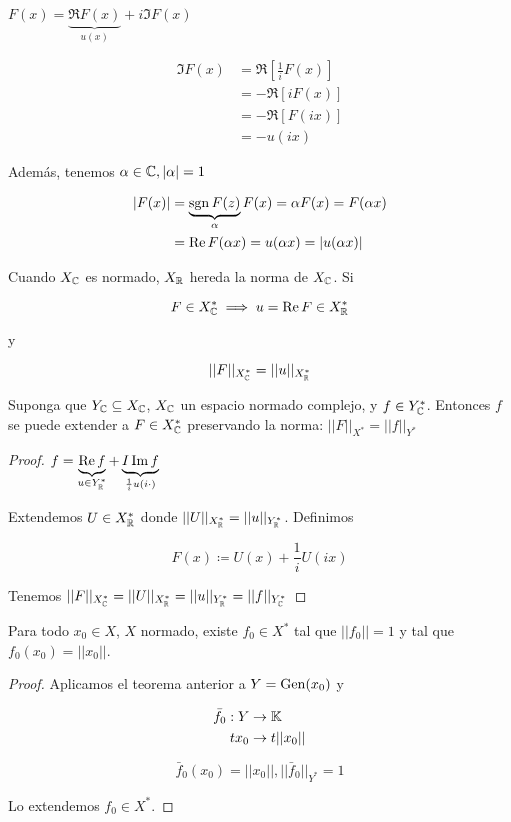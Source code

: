 $F(x)=\underbrace{\Re F(x)}_{u(x)}+i\Im F(x)$

\begin{align*}
    \Im F(x)&=\Re\left[\frac{1}{i} F(x)\right]\\
    &=-\Re[i F(x)]\\
    &=-\Re[F(ix)]\\
    &=-u(ix)
\end{align*}

Además, tenemos $\alpha\in \mathbb{C},|\alpha|=1$

\begin{align*}
    |F(x)|&=\underbrace{\operatorname{sgn} F(z)}_\alpha F(x)=\alpha F(x)=F(\alpha x)\\
    &=\operatorname{Re} F(\alpha x)=u(\alpha x)=|u(\alpha x)|
\end{align*}

Cuando $X_{\mathbb{C}}$ es normado, $X_{\mathbb{R}}$ hereda la norma de $X_{\mathbb{C}}$. Si 

\[F\in X_{\mathbb{C}}^*\implies u=\operatorname{Re} F\in X_{\mathbb{R}}^*\]

y 

\[||F||_{X_{\mathbb{C}}^*}=||u||_{X_{\mathbb{R}}^*}\]

\begin{ftheorem}
    Suponga que $Y_{\mathbb{C}}\subseteq X_{\mathbb{C}}$, $X_{\mathbb{C}}$ un espacio normado complejo, y $f\in Y_{\mathbb{C}}^*$. Entonces $f$ se puede extender a $F\in X_{\mathbb{C}}^*$ preservando la norma: $||F||_{X^*}=||f||_{Y^*}$
\end{ftheorem}

\begin{proof}
    $f=\underbrace{\operatorname{Re} f}_{u\in Y_{\mathbb{R}}^*}+\underbrace{I\operatorname{Im} f}_{\frac{1}{i}u(i\cdot)}$

    Extendemos $U\in X_{\mathbb{R}}^*$ donde $||U||_{X_{\mathbb{R}}^*}=||u||_{Y_{\mathbb{R}}^*}$. Definimos 

    \[F(x)\coloneqq U(x)+\frac{1}{i}U(ix)\]

    Tenemos $||F||_{X_{\mathbb{C}}^*}=||U||_{X_{\mathbb{R}}^*}=||u||_{Y_{\mathbb{R}}^*}=||f||_{Y_{\mathbb{C}}^*}$
\end{proof}

\begin{fcorollary}\label{theo:3.8.4.1}
    Para todo $x_0\in X$, $X$ normado, existe $f_0\in X^*$ tal que $||f_0||=1$ y tal que $f_0(x_0)=||x_0||$.
\end{fcorollary}

\begin{proof}
    Aplicamos el teorema anterior a $Y=\operatorname{Gen}(x_0)$ y

    \begin{align*}
        \bar f_0:Y&\to \mathbb{K}\\
        tx_0&\to t||x_0||
    \end{align*}

    \[\bar f_0(x_0)=||x_0||,||\bar f_0||_{Y^*}=1\]

    Lo extendemos $f_0\in X^*$.
\end{proof}


